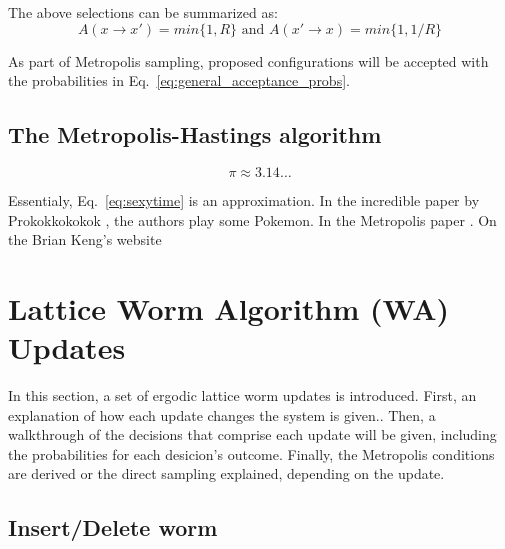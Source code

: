 \documentclass[12pt, two sided]{article}
\begin{document}
The above selections can be summarized as:
%
\begin{equation}
\label{eq:general_acceptance_probs}
A(x \to x') = min\{1,R\} \text{ and } A(x' \to x) = min\{1,1/R\}
\end{equation}
%

As part of Metropolis sampling, proposed configurations will be accepted with the probabilities in Eq.~\eqref{eq:general_acceptance_probs}.

\subsection{The Metropolis-Hastings algorithm}

\begin{equation}
\label{eq:sexytime}
\pi \approx 3.14\dots
\end{equation}

Essentialy, Eq.~\eqref{eq:sexytime} is an approximation. In the incredible paper by Prokokkokokok \cite{Prokof_ev_1998}, the authors play some Pokemon. In the Metropolis paper \cite{doi:10.1063/1.1699114}. On the Brian Keng's website \cite{bkeng.metropolis}

\section{Lattice Worm Algorithm (WA) Updates}

In this section, a set of ergodic lattice worm updates is introduced. First, an explanation of how each update changes the system is given.. Then, a walkthrough of the decisions that comprise each update will be given, including the probabilities for each desicion's outcome. Finally, the Metropolis conditions are derived or the direct sampling explained, depending on the update.

	\subsection{Insert/Delete worm}
        
\end{document}

